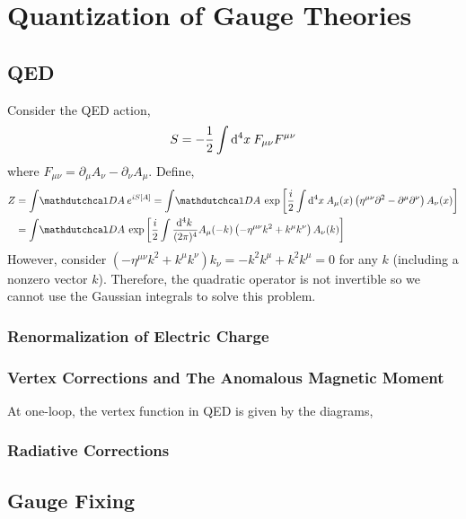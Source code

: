 \documentclass[12pt]{extarticle}
\begin{document}
\section{Quantization of Gauge Theories}

\subsection{QED}

Consider the QED action,
\[ S = - \frac{1}{2} \int \mathrm{d}^{4} x \: F_{\mu \nu} F^{\mu \nu} \]
where $F_{\mu \nu} = \partial_\mu A_\nu - \partial_{\nu} A_\mu$.
Define,
\begin{align*}
Z & = \int \pathd{A} e^{i S[A] } 
= \int \pathd{A} \exp{\left[ \frac{i}{2} \int \dn{4}{x} A_\mu(x) \left( \eta^{\mu \nu} \partial^2 - \partial^\mu \partial^\nu \right) A_\nu(x) \right]}
\\
& = \int \pathd{A} \exp{\left[ \frac{i}{2} \int \frac{\dn{4}{k}}{(2 \pi)^4} A_\mu(-k) \left( -\eta^{\mu \nu} k^2 + k^\mu k^\nu \right) A_\nu(k) \right]}
\end{align*}
However, consider $\left( -\eta^{\mu \nu} k^2 + k^\mu k^\nu \right)k_{\nu} = - k^2 k^\mu + k^2 k^\mu = 0$ for any $k$ (including a nonzero vector $k$).
Therefore, the quadratic operator is not invertible so we cannot use the Gaussian integrals to solve this problem. 

\subsubsection{Renormalization of Electric Charge}

\subsubsection{Vertex Corrections and The Anomalous Magnetic Moment}

At one-loop, the vertex function in QED is given by the diagrams,

\subsubsection{Radiative Corrections}

\subsection{Gauge Fixing}
\end{document}
